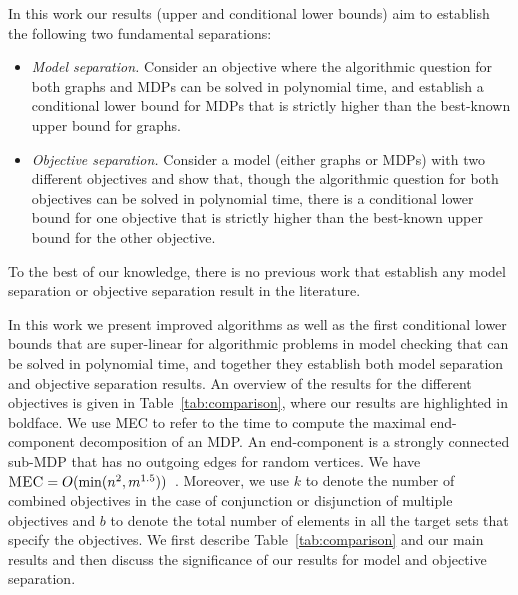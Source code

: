 \documentclass[11pt,letterpaper]{article}
\newif\iffullversion
\newcommand{\infull}[1]{\iffullversion #1\fi}
\begin{document}
\smallskip{} 
In this work our results (upper and conditional lower bounds) aim to establish 
the following two fundamental separations:

\begin{itemize}
\item {\em Model separation.} 
Consider an objective where the algorithmic question for both graphs and MDPs 
can be solved in polynomial time, and establish a conditional lower bound for 
MDPs that is strictly higher than the best-known upper bound for graphs. 
\infull{In other words, the conditional lower bound would separate the model of 
graphs and MDPs for problems (i.e., w.r.t.\ the objective) that can be solved in 
polynomial time.}

\item {\em Objective separation.} 
Consider a model (either graphs or MDPs) with two different objectives and 
show that, though the algorithmic question for both objectives can be solved in 
polynomial time, there is a conditional lower bound for one objective that 
is strictly higher than the best-known upper bound for the other objective.
\infull{In other words, the conditional lower bound would separate the two objectives 
w.r.t.\ the model though they both can be solved in polynomial time.}
\end{itemize}
To the best of our knowledge, there is no previous work that establish any 
model separation or objective separation result in the literature.

\smallskip{} 
In this work we present improved algorithms as well as 
the first conditional lower bounds that are super-linear for algorithmic 
problems in model checking that can be solved in polynomial time, and together
they establish both model separation and objective separation results. 
An overview of the results for the different objectives is given in Table~\ref{tab:comparison},
where our results are highlighted in boldface.
We use  
\textsc{MEC} to refer to the time to compute the maximal end-component 
decomposition of an MDP. An end-component is a\infull{ (non-trivial)}
strongly connected sub-MDP
that has no outgoing edges for random vertices. We have $\textsc{MEC} = O(\min(n^2, 
m^{1.5}))$~\cite{ChatterjeeH14}\infull{ and assume $\textsc{MEC} = \Omega(m)$ 
and $m\ge n$}.
Moreover, we use 
$k$ to denote the number of combined objectives in the case of conjunction 
or disjunction of multiple objectives and 
$b$ to denote the total number of elements in all the target sets
that specify the objectives.
We first describe Table~\ref{tab:comparison} and our main results and then 
discuss the significance of our results for model and objective separation.
\end{document}
